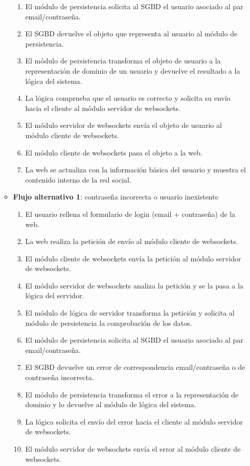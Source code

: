 \begin{enumerate}
\begin{itemize}
\begin{enumerate}
    \item El módulo de persistencia solicita al SGBD el usuario asociado al par email/contraseña.
    \item El SGBD devuelve el objeto que representa al usuario al módulo de persistencia.
    \item El módulo de persistencia transforma el objeto de usuario a la representación de dominio de un usuario y devuelve el resultado a la lógica del sistema.
    \item La lógica comprueba que el usuario es correcto y solicita su envío hacia el cliente al módulo servidor de websockets.
    \item El módulo servidor de websockets envía el objeto de usuario al módulo cliente de websockets.
    \item El módulo cliente de websockets pasa el objeto a la web.
    \item La web se actualiza con la información básica del usuario y muestra el contenido interno de la red social.
    \end{enumerate}
  \item \textbf{Flujo alternativo 1}: contraseña incorrecta o usuario inexistente
    \begin{enumerate}
    \item El usuario rellena el formulario de login (email + contraseña) de la web.
    \item La web realiza la petición de envío al módulo cliente de websockets.
    \item El módulo cliente de websockets envía la petición al módulo servidor de websockets.
    \item El módulo servidor de websockets analiza la petición y se la pasa a la lógica del servidor.
    \item El módulo de lógica de servidor transforma la petición y solicita al módulo de persistencia la comprobación de los datos.
    \item El módulo de persistencia solicita al SGBD el usuario asociado al par email/contraseña.
    \item El SGBD devuelve un error de correspondencia email/contraseña o de contraseña incorrecta.
    \item El módulo de persistencia transforma el error a la representación de dominio y lo devuelve al módulo de lógica del sistema.
    \item La lógica solicita el envío del error hacia el cliente al módulo servidor de websockets.
    \item El módulo servidor de websockets envía el error al módulo cliente de websockets.

\end{enumerate}
\end{itemize}
\end{enumerate}

